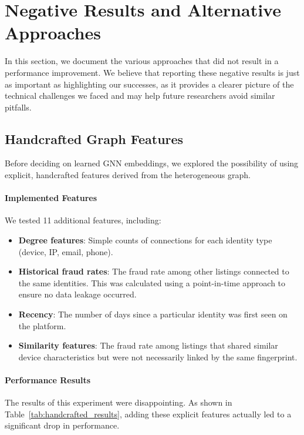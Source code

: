 \section{Negative Results and Alternative Approaches}
\label{sec:5_8}

In this section, we document the various approaches that did not result in a performance improvement. We believe that reporting these negative results is just as important as highlighting our successes, as it provides a clearer picture of the technical challenges we faced and may help future researchers avoid similar pitfalls.

\subsection{Handcrafted Graph Features}

Before deciding on learned GNN embeddings, we explored the possibility of using explicit, handcrafted features derived from the heterogeneous graph.

\paragraph{Implemented Features}
We tested 11 additional features, including:
\begin{itemize}
    \item \textbf{Degree features}: Simple counts of connections for each identity type (device, IP, email, phone).
    \item \textbf{Historical fraud rates}: The fraud rate among other listings connected to the same identities. This was calculated using a point-in-time approach to ensure no data leakage occurred.
    \item \textbf{Recency}: The number of days since a particular identity was first seen on the platform.
    \item \textbf{Similarity features}: The fraud rate among listings that shared similar device characteristics but were not necessarily linked by the same fingerprint.
\end{itemize}

\paragraph{Performance Results}
The results of this experiment were disappointing. As shown in Table~\ref{tab:handcrafted_results}, adding these explicit features actually led to a significant drop in performance.

